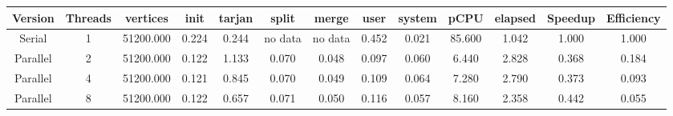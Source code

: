 \begin{tabular}{|c|c|c|c|c|c|c|c|c|c|c|c|c|}
\toprule
 Version &  Threads &  vertices &  init &  tarjan &   split &   merge &  user &  system &   pCPU &  elapsed &  Speedup &  Efficiency \\
\midrule
  Serial &        1 & 51200.000 & 0.224 &   0.244 & no data & no data & 0.452 &   0.021 & 85.600 &    1.042 &    1.000 &       1.000 \\
Parallel &        2 & 51200.000 & 0.122 &   1.133 &   0.070 &   0.048 & 0.097 &   0.060 &  6.440 &    2.828 &    0.368 &       0.184 \\
Parallel &        4 & 51200.000 & 0.121 &   0.845 &   0.070 &   0.049 & 0.109 &   0.064 &  7.280 &    2.790 &    0.373 &       0.093 \\
Parallel &        8 & 51200.000 & 0.122 &   0.657 &   0.071 &   0.050 & 0.116 &   0.057 &  8.160 &    2.358 &    0.442 &       0.055 \\
\bottomrule
\end{tabular}
